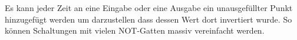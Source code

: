 \documentclass{article}
\begin{document}
Es kann jeder Zeit an eine Eingabe oder eine Ausgabe ein unausgefüllter Punkt hinzugefügt werden um darzustellen dass dessen Wert dort invertiert wurde. So können Schaltungen mit vielen NOT-Gatten massiv vereinfacht werden.
\end{document}
